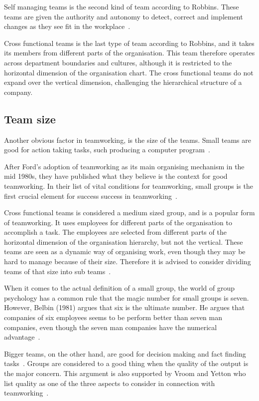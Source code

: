 \documentclass[a4paper,12pt,titlepage]{article}
\begin{document}
  Self managing teams is the second kind of team according
  to Robbins. These teams are given the authority and autonomy
  to detect, correct and implement changes as they see fit in
  the workplace~\cite[287]{sr}.

  Cross functional teams is the last type of team according to
  Robbins, and it takes its members from different parts of the
  organisation. This team therefore operates across department
  boundaries and cultures, although it is restricted to
  the horizontal dimension of the organisation chart. The
  cross functional teams do not expand over the vertical
  dimension, challenging the hierarchical structure of a
  company.

  \subsection{Team size}
  Another obvious factor in teamworking, is the size of the
  teams. Small teams are good for action taking tasks, such
  producing a computer program~\cite[275]{sr}.

  After Ford's adoption of teamworking as its main
  organising mechanism in the mid 1980s, they have published
  what they believe is the context for good teamworking. In
  their list of vital conditions for teamworking,
  small groups is the first crucial element for success
  success in teamworking~\cite[299]{sr}.

  Cross functional teams is considered a medium sized group,
  and is a popular form of teamworking. It uses
  employees for different parts of the organisation to
  accomplish a task. The employees are selected from different
  parts of the horizontal dimension of the organisation
  hierarchy, but not the vertical. These teams are seen as a dynamic
  way of organising work, even though they may be hard to manage
  because of their size. Therefore it is advised to consider
  dividing teams of that size into sub teams~\cite[290]{sr}.

  When it comes to the actual definition of a small group, 
  the world of group psychology has a common rule that the magic
  number for small groups is seven. However, Belbin (1981) argues
  that six is the ultimate number. He argues that companies of
  six employees seems to be perform better than seven man
  companies, even though the seven man companies have the
  numerical advantage~\cite[115-7]{rmb}.

  Bigger teams, on the other hand, are good for decision making
  and fact finding tasks~\cite[275]{sr}. Groups are considered
  to a good thing when the quality of the output is the major concern.
  This argument is also supported by Vroom and Yetton who list quality
  as one of the three aspects to consider in
  connection with teamworking~\cite[743]{ahdb}.
\end{document}
